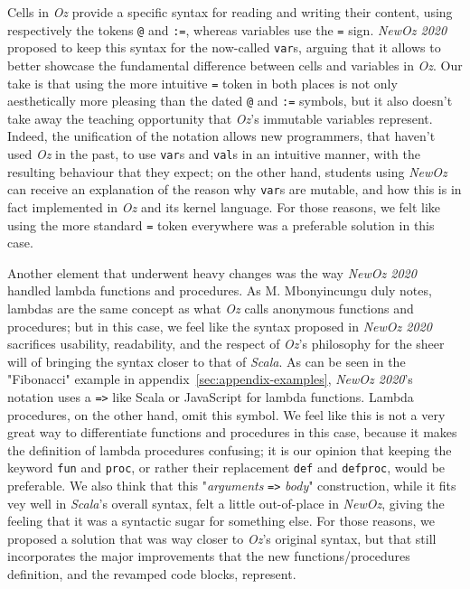 Cells in \textit{Oz} provide a specific syntax for reading and writing their content, using respectively the tokens \texttt{@} and \texttt{:=}, whereas variables use the \texttt{=} sign.
\textit{NewOz 2020} proposed to keep this syntax for the now-called \texttt{var}s, arguing that it allows to better showcase the fundamental difference between cells and variables in \textit{Oz}.
Our take is that using the more intuitive \texttt{=} token in both places is not only aesthetically more pleasing than the dated \texttt{@} and \texttt{:=} symbols, but it also doesn't take away the teaching opportunity that \textit{Oz}'s immutable variables represent.
Indeed, the unification of the notation allows new programmers, that haven't used \textit{Oz} in the past, to use \texttt{var}s and \texttt{val}s in an intuitive manner, with the resulting behaviour that they expect;
on the other hand, students using \textit{NewOz} can receive an explanation of the reason why \texttt{var}s are mutable, and how this is in fact implemented in \textit{Oz} and its kernel language.
For those reasons, we felt like using the more standard \texttt{=} token everywhere was a preferable solution in this case.\newline

Another element that underwent heavy changes was the way \textit{NewOz 2020} handled lambda functions and procedures.
As M. Mbonyincungu duly notes, lambdas are the same concept as what \textit{Oz} calls anonymous functions and procedures;
but in this case, we feel like the syntax proposed in \textit{NewOz 2020} sacrifices usability, readability, and the respect of \textit{Oz}'s philosophy for the sheer will of bringing the syntax closer to that of \textit{Scala}.
As can be seen in the "Fibonacci" example in appendix~\ref{sec:appendix-examples}, \textit{NewOz 2020}'s notation uses a \texttt{=>} like Scala or JavaScript for lambda functions.
Lambda procedures, on the other hand, omit this symbol.
We feel like this is not a very great way to differentiate functions and procedures in this case, because it makes the definition of lambda procedures confusing;
it is our opinion that keeping the keyword \texttt{fun} and \texttt{proc}, or rather their replacement \texttt{def} and \texttt{defproc}, would be preferable.
We also think that this "\textit{arguments} \texttt{=>} \textit{body}" construction, while it fits vey well in \textit{Scala}'s overall syntax, felt a little out-of-place in \textit{NewOz}, giving the feeling that it was a syntactic sugar for something else.
For those reasons, we proposed a solution that was way closer to \textit{Oz}'s original syntax, but that still incorporates the major improvements that the new functions/procedures definition, and the revamped code blocks, represent.\newline


